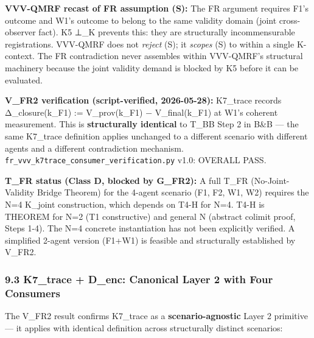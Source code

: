 \documentclass[
  11pt,
]{article}
\begin{document}
\textbf{VVV-QMRF recast of FR assumption (S):} The FR argument requires
F1's outcome and W1's outcome to belong to the same validity domain
(joint cross-observer fact). K5 ⊥\_K prevents this: they are
structurally incommensurable registrations. VVV-QMRF does not
\emph{reject} (S); it \emph{scopes} (S) to within a single K-context.
The FR contradiction never assembles within VVV-QMRF's structural
machinery because the joint validity demand is blocked by K5 before it
can be evaluated.

\textbf{V\_FR2 verification (script-verified, 2026-05-28):} K7\_trace
records Δ\_closure(k\_F1) := V\_prov(k\_F1) − V\_final(k\_F1) at W1's
coherent measurement. This is \textbf{structurally identical} to T\_BB
Step 2 in B\&B --- the same K7\_trace definition applies unchanged to a
different scenario with different agents and a different contradiction
mechanism. \texttt{fr\_vvv\_k7trace\_consumer\_verification.py} v1.0:
OVERALL PASS.

\textbf{T\_FR status (Class D, blocked by G\_FR2):} A full T\_FR
(No-Joint-Validity Bridge Theorem) for the 4-agent scenario (F1, F2, W1,
W2) requires the N=4 K\_joint construction, which depends on T4-H for
N=4. T4-H is THEOREM for N=2 (T1 constructive) and general N (abstract
colimit proof, Steps 1-4). The N=4 concrete instantiation has not been
explicitly verified. A simplified 2-agent version (F1+W1) is feasible
and structurally established by V\_FR2.

\subsubsection{9.3 K7\_trace + D\_enc: Canonical Layer 2 with Four
Consumers}\label{k7_trace-d_enc-canonical-layer-2-with-four-consumers}

The V\_FR2 result confirms K7\_trace as a \textbf{scenario-agnostic}
Layer 2 primitive --- it applies with identical definition across
structurally distinct scenarios:
\end{document}
